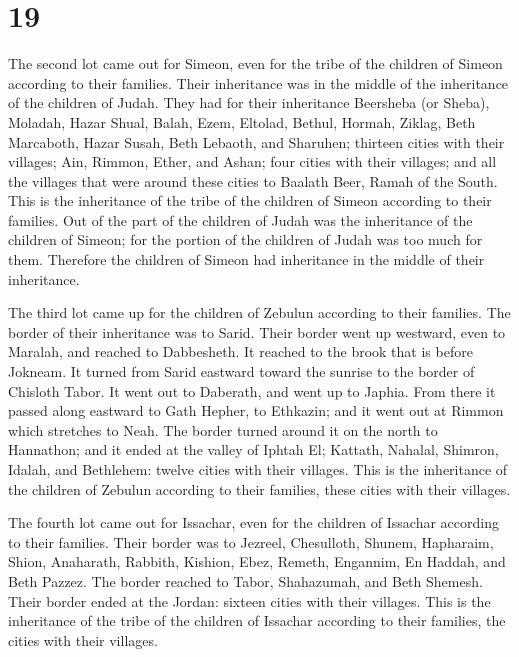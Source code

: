 \hypertarget{section-18}{%
\section{19}\label{section-18}}

 The second lot came out for Simeon, even for the tribe of
the children of Simeon according to their families. Their inheritance
was in the middle of the inheritance of the children of Judah.
 They had for their inheritance Beersheba (or Sheba),
Moladah,  Hazar Shual, Balah, Ezem, 
Eltolad, Bethul, Hormah,  Ziklag, Beth Marcaboth, Hazar
Susah,  Beth Lebaoth, and Sharuhen; thirteen cities with
their villages;  Ain, Rimmon, Ether, and Ashan; four
cities with their villages;  and all the villages that
were around these cities to Baalath Beer, Ramah of the South. This is
the inheritance of the tribe of the children of Simeon according to
their families.  Out of the part of the children of Judah
was the inheritance of the children of Simeon; for the portion of the
children of Judah was too much for them. Therefore the children of
Simeon had inheritance in the middle of their inheritance.

 The third lot came up for the children of Zebulun
according to their families. The border of their inheritance was to
Sarid.  Their border went up westward, even to Maralah,
and reached to Dabbesheth. It reached to the brook that is before
Jokneam.  It turned from Sarid eastward toward the
sunrise to the border of Chisloth Tabor. It went out to Daberath, and
went up to Japhia.  From there it passed along eastward
to Gath Hepher, to Ethkazin; and it went out at Rimmon which stretches
to Neah.  The border turned around it on the north to
Hannathon; and it ended at the valley of Iphtah El; 
Kattath, Nahalal, Shimron, Idalah, and Bethlehem: twelve cities with
their villages.  This is the inheritance of the children
of Zebulun according to their families, these cities with their
villages.

 The fourth lot came out for Issachar, even for the
children of Issachar according to their families.  Their
border was to Jezreel, Chesulloth, Shunem,  Hapharaim,
Shion, Anaharath,  Rabbith, Kishion, Ebez,
 Remeth, Engannim, En Haddah, and Beth Pazzez.
 The border reached to Tabor, Shahazumah, and Beth
Shemesh. Their border ended at the Jordan: sixteen cities with their
villages.  This is the inheritance of the tribe of the
children of Issachar according to their families, the cities with their
villages.

